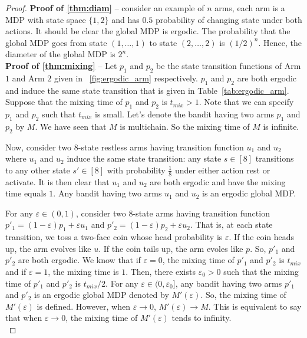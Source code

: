 \begin{proof}
    \textbf{Proof of \ref{thm:diam}} -- consider an example of $n$ arms, each arm is a MDP with state space $\{1,2\}$ and has $0.5$ probability of changing state under both actions.
    It should be clear the global MDP is ergodic.
    The probability that the global MDP goes from state $(1,\dots,1)$ to state $(2,\dots,2)$ is $(1/2)^n$.
    Hence, the diameter of the global MDP is $2^n$.
    \medskip \\

    \textbf{Proof of \ref{thm:mixing}} -- Let $p_1$ and $p_2$ be the state transition functions of Arm $1$ and Arm $2$ given in \figurename~\ref{fig:ergodic_arm} respectively.
    $p_1$ and $p_2$ are both ergodic and induce the same state transition that is given in Table~\ref{tab:ergodic_arm}.
    Suppose that the mixing time of $p_1$ and $p_2$ is $t_{mix}>1$.
    Note that we can specify $p_1$ and $p_2$ such that $t_{mix}$ is small.
    Let's denote the bandit having two arms $p_1$ and $p_2$ by $M$.
    We have seen that $M$ is multichain.
    So the mixing time of $M$ is infinite.

    Now, consider two 8-state restless arms having transition function $u_1$ and $u_2$ where $u_1$ and $u_2$ induce the same state transition: any state $s\in[8]$ transitions to any other state $s'\in[8]$ with probability $\frac18$ under either action rest or activate.
    It is then clear that $u_1$ and $u_2$ are both ergodic and have the mixing time equals $1$.
    Any bandit having two arms $u_1$ and $u_2$ is an ergodic global MDP.

    For any $\varepsilon\in(0,1)$, consider two 8-state arms having transition function $p'_1=(1-\varepsilon)p_1+\varepsilon u_1$ and $p'_2=(1-\varepsilon)p_2+\varepsilon u_2$.
    That is, at each state transition, we toss a two-face coin whose head probability is $\varepsilon$.
    If the coin heads up, the arm evolves like $u$.
    If the coin tails up, the arm evoles like $p$.
    So, $p'_1$ and $p'_2$ are both ergodic.
    We know that if $\varepsilon=0$, the mixing time of $p'_1$ and $p'_2$ is $t_{mix}$ and if $\varepsilon=1$, the mixing time is $1$.
    Then, there exists $\varepsilon_0>0$ such that the mixing time of $p'_1$ and $p'_2$ is $t_{mix}/2$.
    For any $\varepsilon\in(0,\varepsilon_0]$, any bandit having two arms $p'_1$ and $p'_2$ is an ergodic global MDP denoted by $M'(\varepsilon)$.
    So, the mixing time of $M'(\varepsilon)$ is defined.
    However, when $\varepsilon\to0$, $M'(\varepsilon)\to M$.
    This is equivalent to say that when $\varepsilon\to0$, the mixing time of $M'(\varepsilon)$ tends to infinity.
    \medskip \\


\end{proof}
